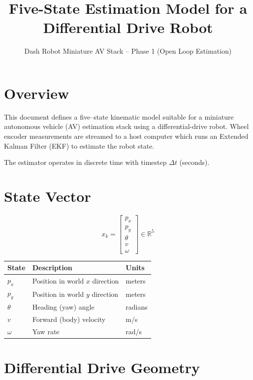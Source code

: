 \documentclass[11pt]{article}
\title{Five-State Estimation Model for a Differential Drive Robot}
\author{Dash Robot Miniature AV Stack -- Phase 1 (Open Loop Estimation)}
\date{}
\begin{document}
\maketitle

\section*{Overview}

This document defines a five–state kinematic model suitable for a miniature
autonomous vehicle (AV) estimation stack using a differential-drive robot.
Wheel encoder measurements are streamed to a host computer which runs an
Extended Kalman Filter (EKF) to estimate the robot state.

The estimator operates in discrete time with timestep $\Delta t$ (seconds).

\section*{State Vector}

\begin{equation}
x_k =
\begin{bmatrix}
p_x \\
p_y \\
\theta \\
v \\
\omega
\end{bmatrix}
\in \mathbb{R}^{5}
\end{equation}

\begin{center}
\begin{tabular}{lll}
\toprule
State & Description & Units \\
\midrule
$p_x$ & Position in world $x$ direction & meters \\
$p_y$ & Position in world $y$ direction & meters \\
$\theta$ & Heading (yaw) angle & radians \\
$v$ & Forward (body) velocity & m/s \\
$\omega$ & Yaw rate & rad/s \\
\bottomrule
\end{tabular}
\end{center}

\section*{Differential Drive Geometry}
\end{document}
